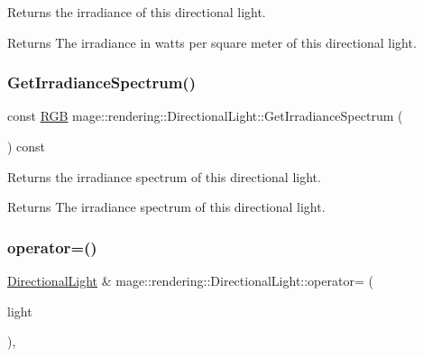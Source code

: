 Returns the irradiance of this directional light.

\begin{DoxyReturn}{Returns}
The irradiance in watts per square meter of this directional light. 
\end{DoxyReturn}
\hypertarget{classmage_1_1rendering_1_1_directional_light_a3a99d3d63a686f8bc587015115a85a81}{}\label{classmage_1_1rendering_1_1_directional_light_a3a99d3d63a686f8bc587015115a85a81} 
\subsubsection{\texorpdfstring{Get\+Irradiance\+Spectrum()}{GetIrradianceSpectrum()}}
{\footnotesize\ttfamily const \hyperlink{structmage_1_1_r_g_b}{R\+GB} mage\+::rendering\+::\+Directional\+Light\+::\+Get\+Irradiance\+Spectrum (\begin{DoxyParamCaption}{ }\end{DoxyParamCaption}) const\hspace{0.3cm}{\ttfamily [noexcept]}}

Returns the irradiance spectrum of this directional light.

\begin{DoxyReturn}{Returns}
The irradiance spectrum of this directional light. 
\end{DoxyReturn}
\hypertarget{classmage_1_1rendering_1_1_directional_light_aa81fa39a4d068d879a6d90587ee324d8}{}\label{classmage_1_1rendering_1_1_directional_light_aa81fa39a4d068d879a6d90587ee324d8} 
\subsubsection{\texorpdfstring{operator=()}{operator=()}\hspace{0.1cm}{\footnotesize\ttfamily [1/2]}}
{\footnotesize\ttfamily \hyperlink{classmage_1_1rendering_1_1_directional_light}{Directional\+Light} \& mage\+::rendering\+::\+Directional\+Light\+::operator= (\begin{DoxyParamCaption}\item[{const \hyperlink{classmage_1_1rendering_1_1_directional_light}{Directional\+Light} \&}]{light }\end{DoxyParamCaption})\hspace{0.3cm}{\ttfamily [default]}, {\ttfamily [noexcept]}}

